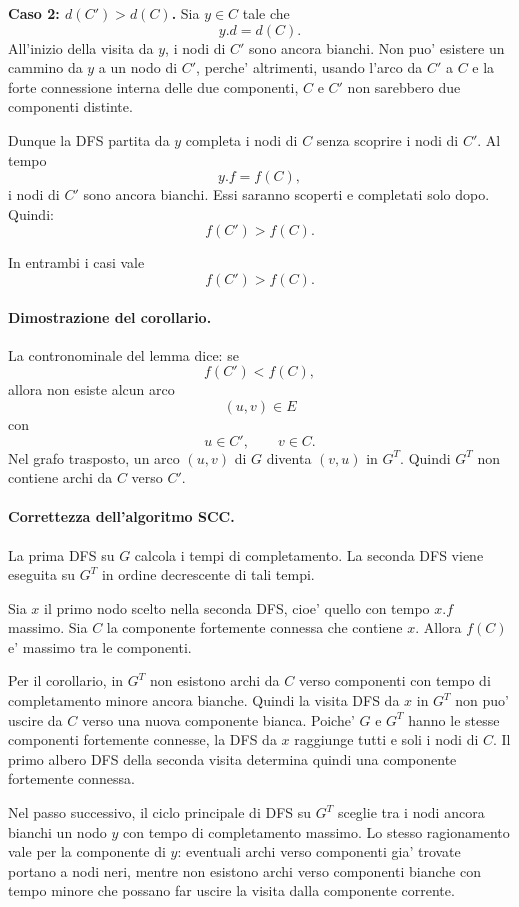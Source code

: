 \textbf{Caso 2: $d(C')>d(C)$.}
Sia $y\in C$ tale che
\[
y.d=d(C).
\]
All'inizio della visita da $y$, i nodi di $C'$ sono ancora bianchi. Non puo' esistere un cammino da $y$ a un nodo di $C'$, perche' altrimenti, usando l'arco da $C'$ a $C$ e la forte connessione interna delle due componenti, $C$ e $C'$ non sarebbero due componenti distinte.

Dunque la DFS partita da $y$ completa i nodi di $C$ senza scoprire i nodi di $C'$. Al tempo
\[
y.f=f(C),
\]
i nodi di $C'$ sono ancora bianchi. Essi saranno scoperti e completati solo dopo. Quindi:
\[
f(C')>f(C).
\]

In entrambi i casi vale
\[
f(C')>f(C).
\]

\paragraph{Dimostrazione del corollario.}
La contronominale del lemma dice: se
\[
f(C')<f(C),
\]
allora non esiste alcun arco
\[
(u,v)\in E
\]
con
\[
u\in C',\qquad v\in C.
\]
Nel grafo trasposto, un arco $(u,v)$ di $G$ diventa $(v,u)$ in $G^T$. Quindi $G^T$ non contiene archi da $C$ verso $C'$.

\paragraph{Correttezza dell'algoritmo SCC.}
La prima DFS su $G$ calcola i tempi di completamento. La seconda DFS viene eseguita su $G^T$ in ordine decrescente di tali tempi.

Sia $x$ il primo nodo scelto nella seconda DFS, cioe' quello con tempo $x.f$ massimo. Sia $C$ la componente fortemente connessa che contiene $x$. Allora $f(C)$ e' massimo tra le componenti.

Per il corollario, in $G^T$ non esistono archi da $C$ verso componenti con tempo di completamento minore ancora bianche. Quindi la visita DFS da $x$ in $G^T$ non puo' uscire da $C$ verso una nuova componente bianca. Poiche' $G$ e $G^T$ hanno le stesse componenti fortemente connesse, la DFS da $x$ raggiunge tutti e soli i nodi di $C$. Il primo albero DFS della seconda visita determina quindi una componente fortemente connessa.

Nel passo successivo, il ciclo principale di DFS su $G^T$ sceglie tra i nodi ancora bianchi un nodo $y$ con tempo di completamento massimo. Lo stesso ragionamento vale per la componente di $y$: eventuali archi verso componenti gia' trovate portano a nodi neri, mentre non esistono archi verso componenti bianche con tempo minore che possano far uscire la visita dalla componente corrente.

